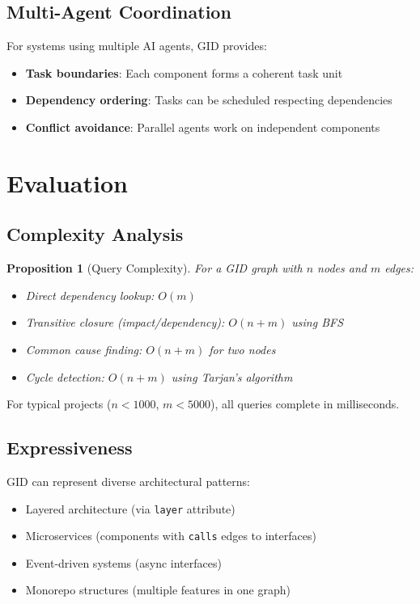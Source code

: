 \documentclass[11pt,a4paper]{article}
\newtheorem{proposition}{Proposition}
\begin{document}
\subsection{Multi-Agent Coordination}

For systems using multiple AI agents, GID provides:
\begin{itemize}[noitemsep]
    \item \textbf{Task boundaries}: Each component forms a coherent task unit
    \item \textbf{Dependency ordering}: Tasks can be scheduled respecting dependencies
    \item \textbf{Conflict avoidance}: Parallel agents work on independent components
\end{itemize}

\section{Evaluation}

\subsection{Complexity Analysis}

\begin{proposition}[Query Complexity]
For a GID graph with $n$ nodes and $m$ edges:
\begin{itemize}[noitemsep]
    \item Direct dependency lookup: $O(m)$
    \item Transitive closure (impact/dependency): $O(n + m)$ using BFS
    \item Common cause finding: $O(n + m)$ for two nodes
    \item Cycle detection: $O(n + m)$ using Tarjan's algorithm
\end{itemize}
\end{proposition}

For typical projects ($n < 1000$, $m < 5000$), all queries complete in milliseconds.

\subsection{Expressiveness}

GID can represent diverse architectural patterns:
\begin{itemize}[noitemsep]
    \item Layered architecture (via \texttt{layer} attribute)
    \item Microservices (components with \texttt{calls} edges to interfaces)
    \item Event-driven systems (async interfaces)
    \item Monorepo structures (multiple features in one graph)
\end{itemize}
\end{document}
